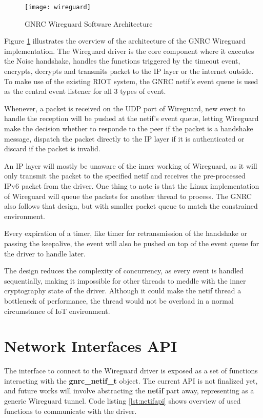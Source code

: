   \begin{figure}[h]
    \centering
    \texttt{[image: wireguard]}
    \caption{GNRC Wireguard Software Architecture}
    \label{fig:wireguard}
  \end{figure}

  Figure \ref{fig:wireguard} illustrates the overview of the architecture of the GNRC Wireguard
  implementation. The Wireguard driver is the core component where it executes the Noise handshake,
  handles the functions triggered by the timeout event, encrypts, decrypts and transmits packet to
  the IP layer or the internet outside. To make use of the existing RIOT system, the GNRC netif's
  event queue is used as the central event listener for all 3 types of event. 
  
  Whenever, a packet is received on the UDP port of Wireguard, new event to handle the reception will be pushed
  at the netif's event queue, letting Wireguard make the decision whether to responde to 
  the peer if the packet is a handshake message, dispatch the packet directly to the IP layer if 
  it is authenticated or discard if the packet is invalid. 

  An IP layer will mostly be unaware of the inner working of Wireguard, as it will only transmit the
  packet to the specified netif and receives the pre-processed IPv6 packet from the driver. One thing
  to note is that the Linux implementation of Wireguard will queue the packets for another thread
  to process. The GNRC also follows that design, but with smaller packet queue to match the
  constrained environment.

  Every expiration of a timer, like timer for retransmission of the handshake or passing the
  keepalive, the event will also be pushed on top of the event queue for the driver to handle later.
  
  The design reduces the complexity of concurrency, as every event is handled sequentially, making it impossible for 
  other threads to
  meddle with the inner cryptography state of the driver. Although it could make the netif thread
  a bottleneck of performance, the thread would not be overload in a normal circumstance of
  IoT environment.

\section{Network Interfaces API}
  The interface to connect to the Wireguard driver is exposed as a set of functions interacting
  with the \textbf{gnrc{\_}netif{\_}t} object. The current API is not finalized yet, and future works 
  will involve abstracting the \textbf{netif} part away, representing as a generic Wireguard tunnel.
  Code listing \ref{lst:netifapi} shows overview of used functions to communicate with the driver.

